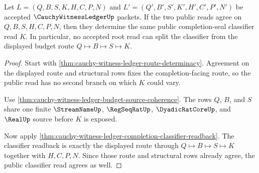 \begin{theorem}
\label{thm:cauchy-witness-ledger-root-budget-coherence}
Let $L=(Q,B,S,K,H,C,P,N)$ and $L'=(Q',B',S',K',H',C',P',N')$ be accepted $\CauchyWitnessLedgerUp$ packets. If the two public reads agree on $Q,B,S,H,C,P,N$, then they determine the same public completion-seal classifier read $K$. In particular, no accepted root read can split the classifier from the displayed budget route $Q \longmapsto B \longmapsto S \longmapsto K$.
\end{theorem}
\begin{proof}
Start with \autoref{thm:cauchy-witness-ledger-route-determinacy}. Agreement on the displayed route and structural rows fixes the completion-facing route, so the public read has no second branch on which $K$ could vary.

Use \autoref{thm:cauchy-witness-ledger-budget-source-coherence}. The rows $Q$, $B$, and $S$ share one finite $\StreamNameUp$, $\RegSeqRatUp$, $\DyadicRatCoreUp$, and $\RealUp$ source before $K$ is exposed.

Now apply \autoref{thm:cauchy-witness-ledger-completion-classifier-readback}. The classifier readback is exactly the displayed route through $Q \longmapsto B \longmapsto S \longmapsto K$ together with $H,C,P,N$. Since those route and structural rows already agree, the public classifier read agrees as well.
\end{proof}

